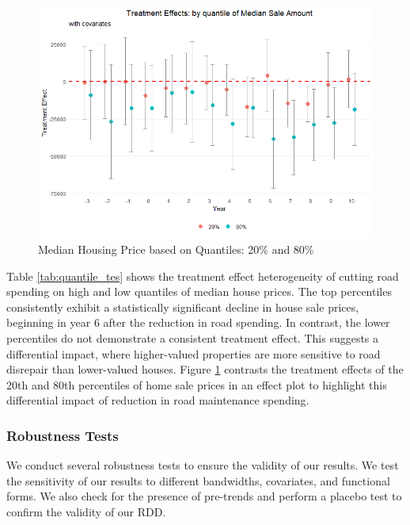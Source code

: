 \begin{figure}[htbp]
    \centering
    \includegraphics[width=\textwidth,keepaspectratio]{images/tes_qte.png}    
    \caption{Median Housing Price based on Quantiles: 20\% and 80\%}
    \label{fig:tes_qte_covs}
\end{figure}

Table \ref{tab:quantile_tes} shows the treatment effect heterogeneity of cutting road spending on high and low quantiles of median house prices. The top percentiles consistently exhibit a statistically significant decline in house sale prices, beginning in year 6 after the reduction in road spending. In contrast, the lower percentiles do not demonstrate a consistent treatment effect. This suggests a differential impact, where higher-valued properties are more sensitive to road disrepair than lower-valued houses. Figure \ref{fig:tes_qte_covs} contrasts the treatment effects of the 20th and 80th percentiles of home sale prices in an effect plot to highlight this differential impact of reduction in road maintenance spending.

\subsubsection{Robustness Tests} We conduct several robustness tests to ensure the validity of our results. We test the sensitivity of our results to different bandwidths, covariates, and functional forms. We also check for the presence of pre-trends and perform a placebo test to confirm the validity of our RDD.

\vskip 0.5cm

